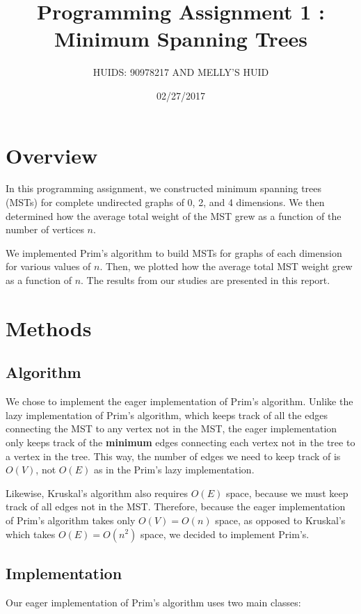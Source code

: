 \documentclass[a4paper]{article}
\title{Programming Assignment 1 : Minimum Spanning Trees}
\author{HUIDS: 90978217 AND MELLY'S HUID}
\date{02/27/2017}
\begin{document}
\maketitle

\section{Overview}
In this programming assignment, we constructed minimum spanning trees (MSTs) for complete undirected graphs of 0, 2, and 4 dimensions. We then determined how the average total weight of the MST grew as a function of the number of vertices $n$.

We implemented Prim's algorithm to build MSTs for graphs of each dimension for various values of $n$. Then, we plotted how the average total MST weight grew as a function of $n$. The results from our studies are presented in this report.


\section{Methods}
\subsection{Algorithm}
We chose to implement the eager implementation of Prim's algorithm. Unlike the lazy implementation of Prim's algorithm, which keeps track of all the edges connecting the MST to any vertex not in the MST, the eager implementation only keeps track of the \textbf{minimum} edges connecting each vertex not in the tree to a vertex in the tree. This way, the number of edges we need to keep track of is $O(V)$, not $O(E)$ as in the Prim's lazy implementation.

Likewise, Kruskal's algorithm also requires $O(E)$ space, because we must keep track of all edges not in the MST. Therefore, because the eager implementation of Prim's algorithm takes only $O(V) = O(n)$ space, as opposed to Kruskal's which takes $O(E) = O(n^2)$ space, we decided to implement Prim's.

\subsection{Implementation}
Our eager implementation of Prim's algorithm uses two main classes:
\end{document}
